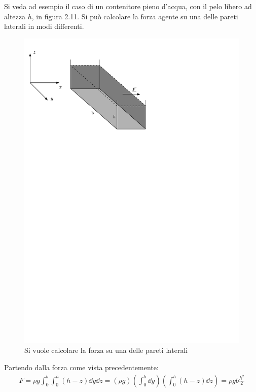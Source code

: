 Si veda ad esempio il caso di un contenitore pieno d'acqua, con il pelo libero ad altezza $h$, in figura 2.11.
Si può calcolare la forza agente su una delle pareti laterali in modi differenti.
	\begin{figure}[ht]
		\includegraphics[scale=0.75]{./2.4 Spinte sulle superfici/2.4-3}
		\centering
		\caption{Si vuole calcolare la forza su una delle pareti laterali}
	\end{figure}
	
Partendo dalla forza come vista precedentemente:
	\begin{equation*}
		\begin{gathered}
			F = \rho g \int_0^b  \int_0^h (h - z) \dd{y} \dd{z} = \left( \rho g \right) \left( \int_0^b  \dd{y} \right) \left( \int_0^h (h - z)  \dd{z} \right) = \rho g b \frac{h^2}{2}
		\end{gathered}
	\end{equation*}
	
